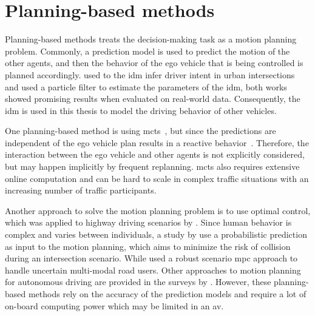 \section{Planning-based methods}
Planning-based methods treats the decision-making task as a motion planning problem. Commonly, a prediction model is used to predict the motion of the other agents, and then the behavior of the ego vehicle that is being controlled is planned accordingly.  used to the \gls{idm} infer driver intent in urban intersections and \citet{Hoermann2017} used a particle filter to estimate the parameters of the \gls{idm}, both works showed promising results when evaluated on real-world data. Consequently, the \gls{idm} is used in this thesis to model the driving behavior of other vehicles.

One planning-based method is using \gls{mcts}~\cite{Browne2012}, but since the predictions are independent of the ego vehicle plan results in a reactive behavior~\cite{Hubmann2017, Sunberg2017}. Therefore, the interaction between the ego vehicle and other agents is not explicitly considered, but may happen implicitly by frequent replanning. \Gls{mcts} also requires extensive online computation and can be hard to scale in complex traffic situations with an increasing number of traffic participants. 

Another approach to solve the motion planning problem is to use optimal control, which was applied to highway driving scenarios by \citet{Werling2010}. Since human behavior is complex and varies between individuals, a study by \citet{Damerow2015} use a probabilistic prediction as input to the motion planning, which aims to minimize the risk of collision during an intersection scenario. While \citet{batkovic2019} used a robust scenario \gls{mpc} approach to handle uncertain multi-modal road users. Other approaches to motion planning for autonomous driving are provided in the surveys by \citet{Gonzales2016,Paden2016}. However, these planning-based methods rely on the accuracy of the prediction models and require a lot of on-board computing power which may be limited in an \gls{av}.


